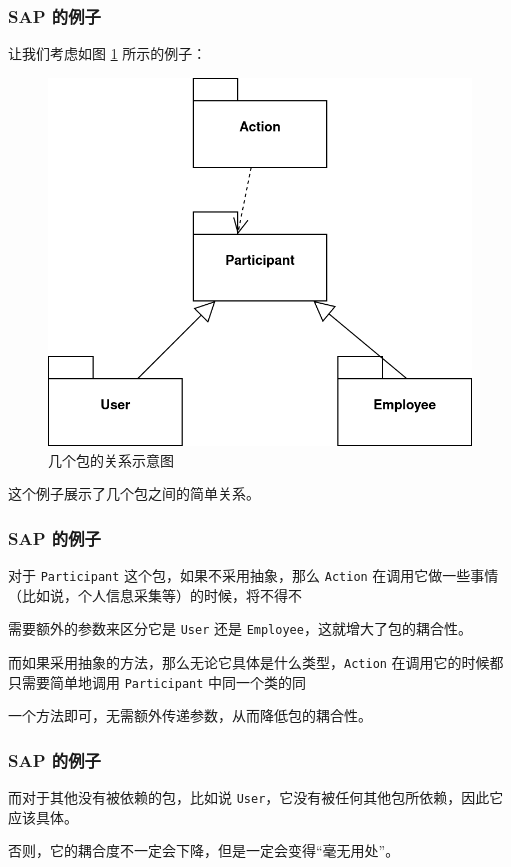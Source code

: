 \documentclass{ctexbeamer}
\begin{document}
    \begin{frame}[fragile]
        \frametitle{SAP 的例子}
    
        让我们考虑如图 \ref{figure:ex1} 所示的例子：

        \begin{figure}
            \centering
            \includegraphics[scale=0.2]{pics/ex1.png}
            \caption{几个包的关系示意图}
            \label{figure:ex1}
        \end{figure}

        \pause
        这个例子展示了几个包之间的简单关系。
        
    
    \end{frame}

    \begin{frame}[fragile]
        \frametitle{SAP 的例子}
        
        对于 \verb|Participant| 这个包，如果不采用抽象，那么 \verb|Action| 在调用它做一些事情（比如说，个人信息采集等）的时候，将不得不

        需要额外的参数来区分它是 \verb|User| 还是 \verb|Employee|，这就增大了包的耦合性。\pause
    
        而如果采用抽象的方法，那么无论它具体是什么类型，\verb|Action| 在调用它的时候都只需要简单地调用 \verb|Participant| 中同一个类的同
        
        一个方法即可，无需额外传递参数，从而降低包的耦合性。
    
    \end{frame}

    \begin{frame}[fragile]
        \frametitle{SAP 的例子}

        而对于其他没有被依赖的包，比如说 \verb|User|，它没有被任何其他包所依赖，因此它应该具体。\pause
        
        否则，它的耦合度不一定会下降，但是一定会变得“毫无用处”。
    \end{frame}
\end{document}
